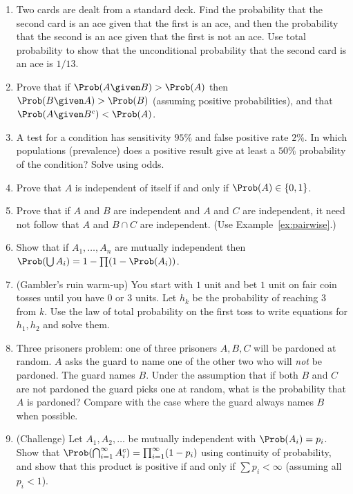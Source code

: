 \begin{enumerate}
\item Two cards are dealt from a standard deck. Find the probability that the
second card is an ace given that the first is an ace, and then the probability
that the second is an ace given that the first is not an ace. Use total
probability to show that the unconditional probability that the second card is
an ace is $1/13$.
\item Prove that if $\Prob(A\given B)>\Prob(A)$ then $\Prob(B\given A)>\Prob(B)$
(assuming positive probabilities), and that $\Prob(A\given B^c)<\Prob(A)$.
\item A test for a condition has sensitivity $95\%$ and false positive rate
$2\%$. In which populations (prevalence) does a positive result give at least
a $50\%$ probability of the condition? Solve using odds.
\item Prove that $A$ is independent of itself if and only if $\Prob(A)\in\{0,1\}$.
\item Prove that if $A$ and $B$ are independent and $A$ and $C$ are independent,
it need not follow that $A$ and $B\cap C$ are independent. (Use
Example~\ref{ex:pairwise}.)
\item Show that if $A_1,\dots,A_n$ are mutually independent then
$\Prob(\bigcup A_i)=1-\prod(1-\Prob(A_i))$.
\item (Gambler's ruin warm-up) You start with $1$ unit and bet $1$ unit on fair
coin tosses until you have $0$ or $3$ units. Let $h_k$ be the probability of
reaching $3$ from $k$. Use the law of total probability on the first toss to
write equations for $h_1,h_2$ and solve them.
\item Three prisoners problem: one of three prisoners $A,B,C$ will be pardoned
at random. $A$ asks the guard to name one of the other two who will \emph{not}
be pardoned. The guard names $B$. Under the assumption that if both $B$ and $C$
are not pardoned the guard picks one at random, what is the probability that
$A$ is pardoned? Compare with the case where the guard always names $B$ when
possible.
\item (Challenge) Let $A_1,A_2,\dots$ be mutually independent with
$\Prob(A_i)=p_i$. Show that
$\Prob(\bigcap_{i=1}^\infty A_i^c)=\prod_{i=1}^\infty(1-p_i)$ using continuity
of probability, and show that this product is positive if and only if
$\sum p_i<\infty$ (assuming all $p_i<1$).
\end{enumerate}
